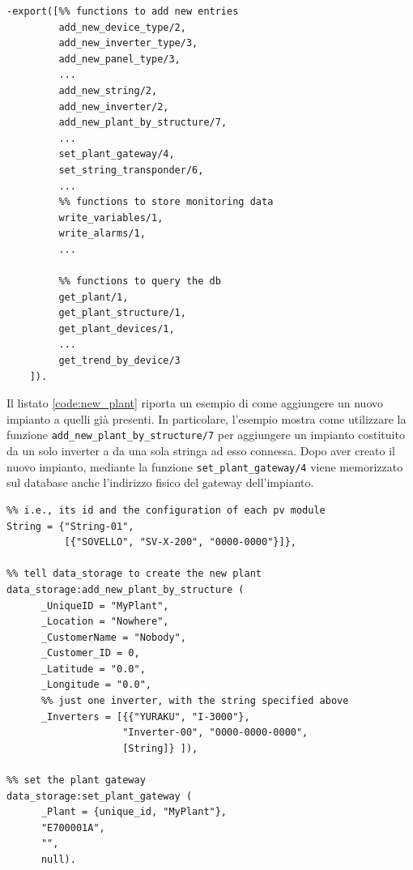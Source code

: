 %
\begin{lstlisting}[caption={Interfaccia del modulo \texttt{data\_storage}}, label={code:data_storage_interface},frame=trBL]
-export([%% functions to add new entries
         add_new_device_type/2,
         add_new_inverter_type/3,
         add_new_panel_type/3,
         ...
         add_new_string/2,
         add_new_inverter/2,
         add_new_plant_by_structure/7,
         ...
         set_plant_gateway/4,
         set_string_transponder/6,
         ...    
         %% functions to store monitoring data
         write_variables/1,
         write_alarms/1,
         ...

         %% functions to query the db
         get_plant/1,
         get_plant_structure/1,
         get_plant_devices/1,
         ...
         get_trend_by_device/3
	]).
\end{lstlisting}
%
Il listato \ref{code:new_plant} riporta un esempio di come aggiungere un nuovo impianto
a quelli gi\`a presenti. In particolare, l'esempio mostra come utilizzare la funzione 
\texttt{add\_new\_plant\_by\_structure/7} per aggiungere un impianto costituito da un 
solo inverter a da una sola stringa ad esso connessa.
%
Dopo aver creato il nuovo impianto, mediante la funzione \texttt{set\_plant\_gateway/4}
viene memorizzato sul database anche l'indirizzo fisico del gateway dell'impianto.
%

%
\begin{lstlisting}[caption={Inserimento di un nuovo impianto}, label={code:new_plant},frame=trBL]
%% specify the string configuration
%% i.e., its id and the configuration of each pv module
String = {"String-01", 
          [{"SOVELLO", "SV-X-200", "0000-0000"}]},

%% tell data_storage to create the new plant
data_storage:add_new_plant_by_structure (
      _UniqueID = "MyPlant", 
      _Location = "Nowhere",
      _CustomerName = "Nobody", 
      _Customer_ID = 0,
      _Latitude = "0.0", 
      _Longitude = "0.0",
      %% just one inverter, with the string specified above
      _Inverters = [{{"YURAKU", "I-3000"}, 
                    "Inverter-00", "0000-0000-0000", 
                    [String]} ]),
    
%% set the plant gateway
data_storage:set_plant_gateway (
      _Plant = {unique_id, "MyPlant"}, 
      "E700001A", 
      "", 
      null).
\end{lstlisting}
%

